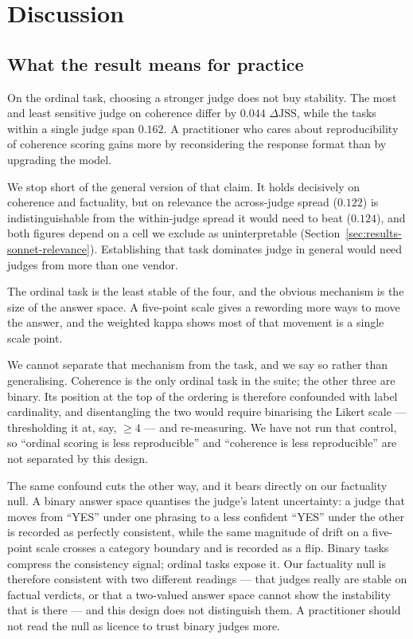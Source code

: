 \section{Discussion}
\label{sec:discussion}

\subsection{What the result means for practice}

On the ordinal task, choosing a stronger judge does not buy stability. The most
and least sensitive judge on coherence differ by $0.044$
$\Delta\mathrm{JSS}$, while the tasks within a single judge span $0.162$. A
practitioner who cares about reproducibility of coherence scoring gains more by
reconsidering the response format than by upgrading the model.

We stop short of the general version of that claim. It holds decisively on
coherence and factuality, but on relevance the across-judge spread ($0.122$) is
indistinguishable from the within-judge spread it would need to beat ($0.124$),
and both figures depend on a cell we exclude as uninterpretable
(Section~\ref{sec:results-sonnet-relevance}). Establishing that task dominates
judge in general would need judges from more than one vendor.

The ordinal task is the least stable of the four, and the obvious mechanism is
the size of the answer space. A five-point scale gives a rewording more ways to
move the answer, and the weighted kappa shows most of that movement is a single
scale point.

We cannot separate that mechanism from the task, and we say so rather than
generalising. Coherence is the only ordinal task in the suite; the other three
are binary. Its position at the top of the ordering is therefore confounded with
label cardinality, and disentangling the two would require binarising the Likert
scale --- thresholding it at, say, $\geq 4$ --- and re-measuring. We have not run
that control, so ``ordinal scoring is less reproducible'' and ``coherence is less
reproducible'' are not separated by this design.

The same confound cuts the other way, and it bears directly on our factuality
null. A binary answer space quantises the judge's latent uncertainty: a judge
that moves from ``YES'' under one phrasing to a less confident ``YES'' under the
other is recorded as perfectly consistent, while the same magnitude of drift on a
five-point scale crosses a category boundary and is recorded as a flip. Binary
tasks compress the consistency signal; ordinal tasks expose it. Our factuality
null is therefore consistent with two different readings --- that judges really
are stable on factual verdicts, or that a two-valued answer space cannot show the
instability that is there --- and this design does not distinguish them. A
practitioner should not read the null as licence to trust binary judges more.

